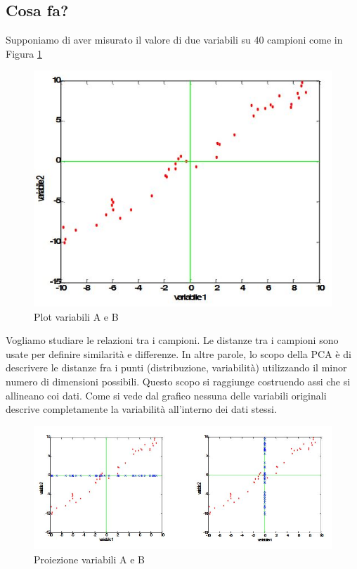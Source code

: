 \documentclass[12pt]{article}
\begin{document}
	\subsection{Cosa fa?}
		Supponiamo di aver misurato il valore di due variabili su 40 campioni come in Figura \ref{fig:plot1} 
		\begin{figure}[H]
			\begin{center}
				\includegraphics[scale=.5]{plotTeoria}
				\caption{Plot variabili A e B}
				\label{fig:plot1}
			\end{center}
		\end{figure}
		Vogliamo studiare le relazioni tra i campioni. Le distanze tra i campioni sono usate per definire similarità e differenze. In altre parole, lo scopo della \ac{PCA} è di descrivere le distanze fra i punti (distribuzione, variabilità) utilizzando il minor numero di dimensioni possibili. Questo scopo si raggiunge costruendo assi che si allineano coi dati. Come si vede dal grafico nessuna delle variabili originali descrive completamente la variabilità all’interno dei dati stessi. 
		\begin{figure}[H]
			\begin{center}
				\includegraphics[scale=.6]{proiezione}
				\caption{Proiezione variabili A e B}
				\label{fig:proiezione}
			\end{center}
		\end{figure}
\end{document}
